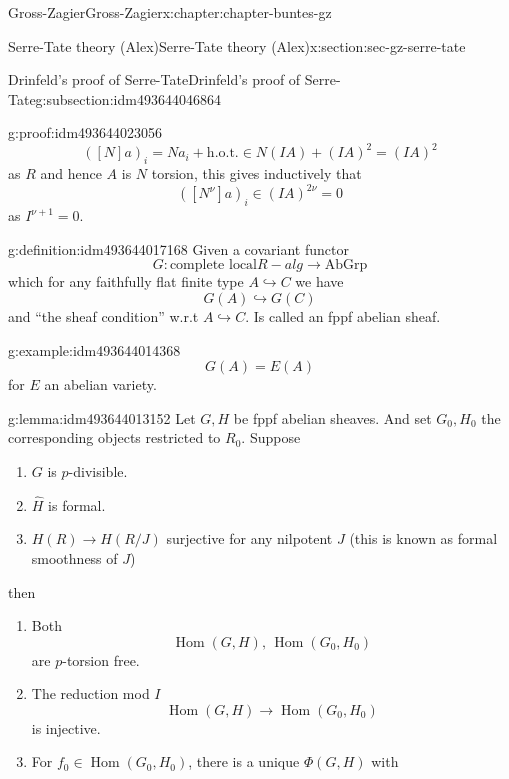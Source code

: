 \documentclass[oneside,10pt,]{book}
\numberwithin{equation}{section}
\newcommand{\lb}{[}
\newcommand{\rb}{]}
\DeclareMathOperator{\Hom}{Hom}
\begin{document}
\begin{chapterptx}{Gross-Zagier}{}{Gross-Zagier}{}{}{x:chapter:chapter-buntes-gz}
\begin{sectionptx}{Serre-Tate theory (Alex)}{}{Serre-Tate theory (Alex)}{}{}{x:section:sec-gz-serre-tate}
\begin{subsectionptx}{Drinfeld's proof of Serre-Tate}{}{Drinfeld's proof of Serre-Tate}{}{}{g:subsection:idm493644046864}
\begin{proofptx}{}{g:proof:idm493644023056}
\begin{equation*}
(\lb N\rb a)_i = N a_i + \text{h.o.t.} \in N(IA) + (IA)^2 = (IA)^2
\end{equation*}
as \(R\) and hence \(A\) is \(N\) torsion, this gives inductively that%
\begin{equation*}
([N^\nu] a)_i \in (IA)^{2\nu}  =0
\end{equation*}
as \(I^{\nu + 1}   =0 \).%
\end{proofptx}
\begin{definition}{}{g:definition:idm493644017168}%
Given a covariant functor%
\begin{equation*}
G \colon \text{complete local} R-alg \to \text{AbGrp}
\end{equation*}
which for any faithfully flat finite type \(A \hookrightarrow C\) we have%
\begin{equation*}
G(A)\hookrightarrow G(C)
\end{equation*}
and ``the sheaf condition'' w.r.t \(A\hookrightarrow C\). Is called an fppf abelian sheaf.%
\end{definition}
\begin{example}{}{g:example:idm493644014368}%
%
\begin{equation*}
G(A) = E(A)
\end{equation*}
for \(E\) an abelian variety.%
\end{example}
\begin{lemma}{}{}{g:lemma:idm493644013152}%
Let \(G,H\) be fppf abelian sheaves. And set \(G_0, H_0\) the corresponding objects restricted to \(R_0\). Suppose%
\begin{enumerate}
\item{}\(G\) is \(p\)-divisible.%
\item{}\(\hat H\) is formal.%
\item{}\(H (R) \to H(R/J)\) surjective for any nilpotent \(J\) (this is known as formal smoothness of \(J\))%
\end{enumerate}
then%
\begin{enumerate}
\item{}Both%
\begin{equation*}
\Hom (G,H),\,\Hom(G_0,H_0)
\end{equation*}
are \(p\)-torsion free.%
\item{}The reduction mod \(I\)%
\begin{equation*}
\Hom(G, H) \to  \Hom(G_0, H_0)
\end{equation*}
is injective.%
\item{}For \(f_0 \in \Hom(G_0,H_0)\), there is a unique \(\Phi (G, H)\) with%

\end{enumerate}
\end{lemma}
\end{subsectionptx}
\end{sectionptx}
\end{chapterptx}
\end{document}
